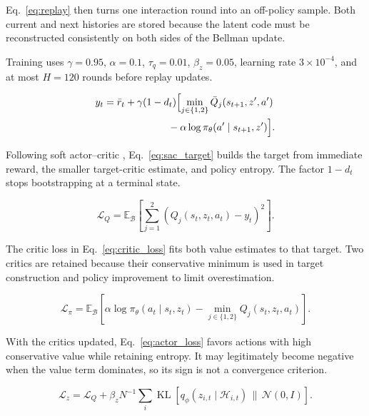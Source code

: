 \documentclass[journal]{IEEEtran}
\newcommand{\E}{\mathbb{E}}
\newcommand{\eqnote}[1]{\par\vspace{-0.3ex}\noindent #1\par\vspace{0.4ex}}
\begin{document}
\eqnote{Eq.~\eqref{eq:replay} then turns one interaction round into an off-policy sample. Both current and next histories are stored because the latent code must be reconstructed consistently on both sides of the Bellman update.}

Training uses $\gamma=0.95$, $\alpha=0.1$, $\tau_q=0.01$, $\beta_z=0.05$, learning rate $3\times10^{-4}$, and at most $H=120$ rounds before replay updates.

\begin{equation}
\begin{aligned}
y_t={}&\bar r_t+\gamma(1-d_t)\Bigl[
\min_{j\in\{1,2\}}\bar Q_j(s_{t+1},z',a')\\
&\hspace{18mm}-\alpha\log\pi_\theta(a'\mid s_{t+1},z')\Bigr].
\end{aligned}
\label{eq:sac_target}
\end{equation}

\eqnote{Following soft actor--critic \cite{ref5}, Eq.~\eqref{eq:sac_target} builds the target from immediate reward, the smaller target-critic estimate, and policy entropy. The factor $1-d_t$ stops bootstrapping at a terminal state.}

\begin{equation}
\mathcal L_Q=\E_{\mathcal B}\left[
\sum_{j=1}^{2}\left(Q_j(s_t,z_t,a_t)-y_t\right)^2\right].
\label{eq:critic_loss}
\end{equation}

\eqnote{The critic loss in Eq.~\eqref{eq:critic_loss} fits both value estimates to that target. Two critics are retained because their conservative minimum is used in target construction and policy improvement to limit overestimation.}

\begin{equation}
\mathcal L_\pi=\E_{\mathcal B}\left[
\alpha\log\pi_\theta(a_t\mid s_t,z_t)
-\min_{j\in\{1,2\}}Q_j(s_t,z_t,a_t)\right].
\label{eq:actor_loss}
\end{equation}

\eqnote{With the critics updated, Eq.~\eqref{eq:actor_loss} favors actions with high conservative value while retaining entropy. It may legitimately become negative when the value term dominates, so its sign is not a convergence criterion.}

\begin{equation}
\mathcal L_z=\mathcal L_Q+\beta_zN^{-1}\sum_i
\operatorname{KL}\!\left[q_\phi(z_{i,t}\mid\mathcal H_{i,t})
\,\|\,\mathcal N(0,I)\right].
\label{eq:encoder_loss}
\end{equation}
\end{document}

